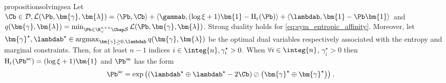 \begin{restatable}{proposition}{solvingsea}
\label{prop:sol_gamma_non_null}
Let $\Cb \in \mathcal{D}, \mathcal{L}(\Pb, \bm{\gamma}, \bm{\lambda})= \langle \Pb, \Cb \rangle + \langle \gammab, (\log{\xi} + 1) \bm{1} - \operatorname{H}_{\mathrm{r}}(\Pb) \rangle + \langle \lambdab, \bm{1} - \Pb \bm{1} \rangle$ and $q(\bm{\gamma}, \bm{\lambda}) = \min_{\Pb \in \R_{+}^{n \times n} \Cbap \mathcal{S}} \mathcal{L}(\Pb, \bm{\gamma}, \bm{\lambda})$. Strong duality holds for \eqref{eq:sym_entropic_affinity}. Moreover, let
$\bm{\gamma}^\star, \lambdab^\star \in \operatorname{argmax}_{\bm{\gamma} \geq 0, \lambdab} q(\bm{\gamma}, \bm{\lambda})$ be the optimal dual variables respectively associated with the entropy and marginal constraints. Then, for at least $n-1$ indices $i \in \integ{n}, \gamma^{\star}_i > 0$.
When $\forall i \in \integ{n}$, $\gamma^\star_i > 0$ then $\operatorname{H}_{\mathrm{r}}(\Pb^{\mathrm{se}}) = (\log \xi + 1)\bm{1}$ and $\Pb^{\mathrm{se}}$ has the form
\begin{align}
    \Pb^{\mathrm{se}} &= \exp{\left(\left(\lambdab^\star \oplus \lambdab^\star - 2 \Cb \right) \oslash \left(\bm{\gamma}^\star \oplus \bm{\gamma}^\star \right) \right)} \:.
\end{align}
\end{restatable}
